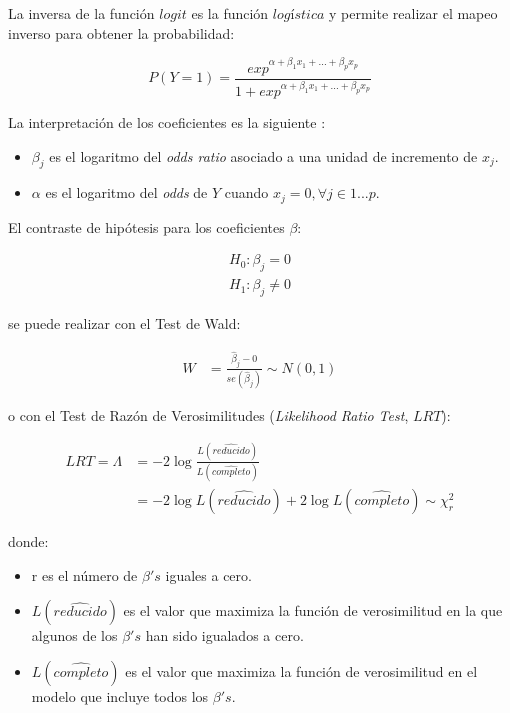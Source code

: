 \documentclass[
  12pt,
  a4paper,
  extrafontsizes,
  onecolumn,
  openright,
  table]{memoir}
\providecommand{\tightlist}{%
  \setlength{\itemsep}{0pt}\setlength{\parskip}{0pt}}\usepackage{longtable,booktabs,array}
\begin{document}
La inversa de la función \(logit\) es la función \(logística\) y permite
realizar el mapeo inverso para obtener la probabilidad:

\[
P(Y=1) = \frac{exp^{\alpha+\beta_1x_1+...+\beta_px_p}}{1 + exp^{\alpha+\beta_1x_1+...+\beta_px_p}}
\]

La interpretación de los coeficientes es la siguiente
\autocite[ver][p.~260]{frienly2015}:

\begin{itemize}
\tightlist
\item
  \(\beta_j\) es el logaritmo del \emph{odds ratio} asociado a una
  unidad de incremento de \(x_j\).
\item
  \(\alpha\) es el logaritmo del \emph{odds} de \(Y\) cuando
  \(x_j=0, \forall j \in 1...p\).
\end{itemize}

El contraste de hipótesis para los coeficientes \(\beta\):

\[
\begin{aligned}
H_0: \beta_j =  0 \\
H_1: \beta_j \ne  0
\end{aligned}
\]

se puede realizar con el Test de Wald:

\[
\begin{aligned}
W & = \frac{\hat\beta_j - 0}{se(\hat\beta_j)} \sim N(0,1)
\end{aligned}
\]

o con el Test de Razón de Verosimilitudes (\emph{Likelihood Ratio Test},
\(LRT\)):

\[
\begin{aligned}
LRT = \Lambda &= -2 \log \frac{L(\widehat{reducido})}{L(\widehat{completo})}\\
&= -2 \log L(\widehat{reducido}) + 2 \log L(\widehat{completo}) \sim \chi^2_r
\end{aligned}
\]

donde:

\begin{itemize}
\tightlist
\item
  r es el número de \(\beta's\) iguales a cero.
\item
  \(L(\widehat{reducido})\) es el valor que maximiza la función de
  verosimilitud en la que algunos de los \(\beta's\) han sido igualados
  a cero.
\item
  \(L(\widehat{completo})\) es el valor que maximiza la función de
  verosimilitud en el modelo que incluye todos los \(\beta's\).
\end{itemize}
\end{document}

